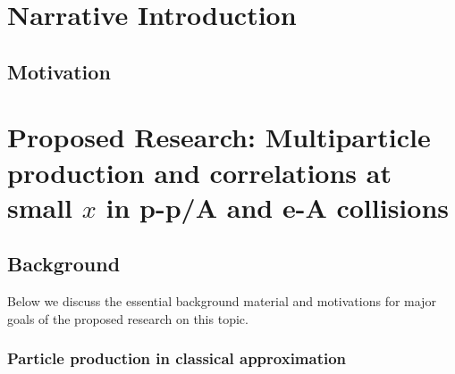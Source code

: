 \noindent

\section{Narrative Introduction}
    \label{sec:introduction}
    

    \vspace{0.5em}
    \subsection{Motivation}
        \label{sec:motivation}
        




\section{Proposed Research: Multiparticle production and correlations at small $x$ in p-p/A and 
e-A collisions}
    \label{sec:p1}

    \vspace{0.5em}
    \subsection{Background}
    \label{sec:p1b}

Below we discuss the essential background material and motivations for major
goals of the proposed research on this topic. 

\subsubsection*{Particle production in classical approximation}
	
